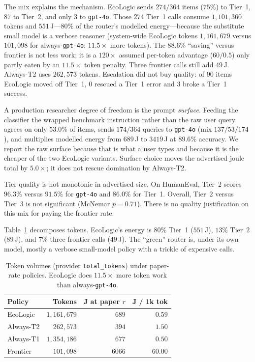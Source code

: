\documentclass[10pt,conference]{IEEEtran}
\begin{document}
The mix explains the mechanism. EcoLogic sends $274/364$ items ($75\%$) to Tier~1, $87$ to Tier~2, and only $3$ to \texttt{gpt-4o}. Those $274$ Tier~1 calls consume $1{,}101{,}360$ tokens and $551$\,J---$80\%$ of the router's modelled energy---because the substitute small model is a verbose reasoner (system-wide EcoLogic tokens $1{,}161{,}679$ versus $101{,}098$ for always-\texttt{gpt-4o}: $11.5\times$ more tokens). The $88.6\%$ ``saving'' versus frontier is not less work; it is a $120\times$ assumed per-token advantage ($60/0.5$) only partly eaten by an $11.5\times$ token penalty. Three frontier calls still add $49$\,J. Always-T2 uses $262{,}573$ tokens. Escalation did not buy quality: of $90$ items EcoLogic moved off Tier~1, $0$ rescued a Tier~1 error and $3$ broke a Tier~1 success.

A production researcher degree of freedom is the prompt \emph{surface}. Feeding the classifier the wrapped benchmark instruction rather than the raw user query agrees on only $53.0\%$ of items, sends $174/364$ queries to \texttt{gpt-4o} (mix $137/53/174$), and multiplies modelled energy from $689$\,J to $3419$\,J at $89.6\%$ accuracy. We report the raw surface because that is what a user types and because it is the cheaper of the two EcoLogic variants. Surface choice moves the advertised joule total by $5.0\times$; it does not rescue domination by Always-T2.

Tier quality is not monotonic in advertised size. On HumanEval, Tier~2 scores $96.3\%$ versus $91.5\%$ for \texttt{gpt-4o} and $86.0\%$ for Tier~1. Overall, Tier~2 versus Tier~3 is not significant (McNemar $p=0.71$). There is no quality justification on this mix for paying the frontier rate.

Table~\ref{tab:tokens} decomposes tokens. EcoLogic's energy is $80\%$ Tier~1 ($551$\,J), $13\%$ Tier~2 ($89$\,J), and $7\%$ three frontier calls ($49$\,J). The ``green'' router is, under its own model, mostly a verbose small-model policy with a trickle of expensive calls.

\begin{table}[t]
\caption{Token volumes (provider \texttt{total\_tokens}) under paper-rate policies. EcoLogic does $11.5\times$ more token work than always-\texttt{gpt-4o}.}
\label{tab:tokens}
\centering
\begin{tabular}{lrrr}
\toprule
Policy & Tokens & J at paper $r$ & J / 1k tok \\
\midrule
EcoLogic & $1{,}161{,}679$ & $689$ & $0.59$ \\
Always-T2 & $262{,}573$ & $394$ & $1.50$ \\
Always-T1 & $1{,}354{,}186$ & $677$ & $0.50$ \\
Frontier & $101{,}098$ & $6066$ & $60.00$ \\
\bottomrule
\end{tabular}
\end{table}
\end{document}
